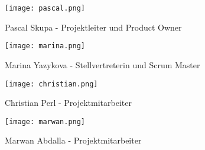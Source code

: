\begin{figure}[H] \centering \texttt{[image: pascal.png]} \caption{Pascal Skupa - Projektleiter und Product Owner} \end{figure}



\begin{figure}[H] \centering \texttt{[image: marina.png]} \caption{Marina Yazykova - Stellvertreterin und Scrum Master
} \end{figure}


\begin{figure}[H] \centering \texttt{[image: christian.png]} \caption{Christian Perl - Projektmitarbeiter} \end{figure}


\begin{figure}[H] \centering \texttt{[image: marwan.png]} \caption{Marwan Abdalla - Projektmitarbeiter} \end{figure}
